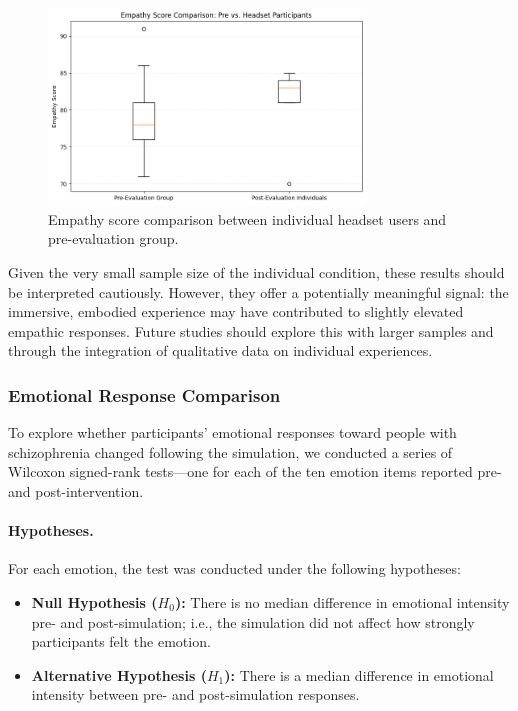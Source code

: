 \begin{figure}[htbp]
    \centering
    \includegraphics[width=0.75\textwidth]{../../Figures/boxplot-indiv.png} 
    \caption{Empathy score comparison between individual headset users and pre-evaluation group.}
    \label{fig:boxplot_indiv_vs_pre}
\end{figure}

Given the very small sample size of the individual condition, these results should be interpreted cautiously. However, they offer a potentially meaningful signal: the immersive, embodied experience may have contributed to slightly elevated empathic responses. Future studies should explore this with larger samples and through the integration of qualitative data on individual experiences.


\subsubsection{Emotional Response Comparison}

To explore whether participants’ emotional responses toward people with schizophrenia changed following the simulation, we conducted a series of Wilcoxon signed-rank tests—one for each of the ten emotion items reported pre- and post-intervention.

\paragraph{Hypotheses.} For each emotion, the test was conducted under the following hypotheses:
\begin{itemize}
    \item \textbf{Null Hypothesis ($H_0$):} There is no median difference in emotional intensity pre- and post-simulation; i.e., the simulation did not affect how strongly participants felt the emotion.
    \item \textbf{Alternative Hypothesis ($H_1$):} There is a median difference in emotional intensity between pre- and post-simulation responses.
\end{itemize}

